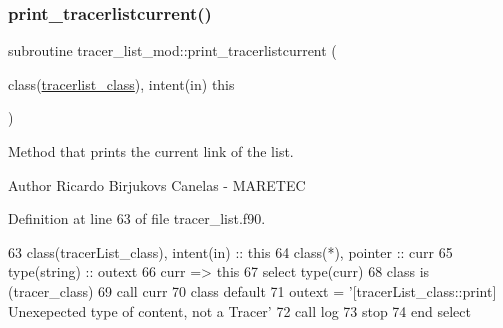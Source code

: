\subsubsection{\texorpdfstring{print\+\_\+tracerlistcurrent()}{print\_tracerlistcurrent()}}
{\footnotesize\ttfamily subroutine tracer\+\_\+list\+\_\+mod\+::print\+\_\+tracerlistcurrent (\begin{DoxyParamCaption}\item[{class(\mbox{\hyperlink{structtracer__list__mod_1_1tracerlist__class}{tracerlist\+\_\+class}}), intent(in)}]{this }\end{DoxyParamCaption})\hspace{0.3cm}{\ttfamily [private]}}



Method that prints the current link of the list. 

\begin{DoxyAuthor}{Author}
Ricardo Birjukovs Canelas -\/ M\+A\+R\+E\+T\+EC 
\end{DoxyAuthor}


Definition at line 63 of file tracer\+\_\+list.\+f90.


\begin{DoxyCode}
63     \textcolor{keywordtype}{class}(tracerList\_class), \textcolor{keywordtype}{intent(in)} :: this
64     \textcolor{keywordtype}{class}(*), \textcolor{keywordtype}{pointer} :: curr
65     \textcolor{keywordtype}{type}(string) :: outext
66     curr => this%
67     \textcolor{keywordflow}{select type}(curr)
68 \textcolor{keywordflow}{    class is} (tracer\_class)
69         \textcolor{keyword}{call }curr%
70 \textcolor{keywordflow}{        class default}
71         outext = \textcolor{stringliteral}{'[tracerList\_class::print] Unexepected type of content, not a Tracer'}
72         \textcolor{keyword}{call }log%
73         stop
74 \textcolor{keywordflow}{    end select}
\end{DoxyCode}
